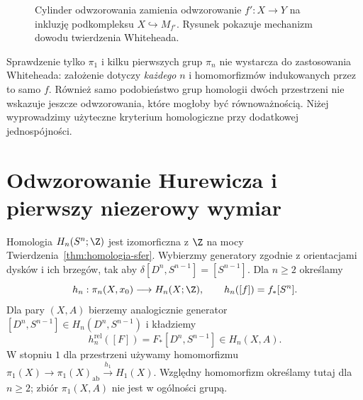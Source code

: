 \begin{figure}[H]
\centering
{}
\caption{Cylinder odwzorowania zamienia
odwzorowanie $f':X\to Y$ na inkluzję
podkompleksu $X\hookrightarrow M_{f'}$.
Rysunek pokazuje mechanizm dowodu
twierdzenia Whiteheada.}
\label{fig:cylinder-whiteheada}
\end{figure}

\begin{uwaga}
Sprawdzenie tylko $\pi_1$ i kilku pierwszych grup $\pi_n$
nie wystarcza do zastosowania Whiteheada: założenie dotyczy
\emph{każdego} $n$ i homomorfizmów indukowanych przez to samo $f$.
Również samo podobieństwo grup homologii dwóch przestrzeni
nie wskazuje jeszcze odwzorowania, które mogłoby być równoważnością.
Niżej wyprowadzimy użyteczne kryterium homologiczne
przy dodatkowej jednospójności.
\end{uwaga}

\section{Odwzorowanie Hurewicza i pierwszy niezerowy wymiar}
\label{sec:hurewicz-wyzszy}

\begin{definicja}
\label{def:mapa-hurewicza}
Homologia $H_n(S^n;\Z)$
jest izomorficzna z $\Z$
na mocy
Twierdzenia~\ref{thm:homologia-sfer}.
Wybierzmy generatory zgodnie z orientacjami dysków i ich brzegów,
tak aby $\delta[D^n,S^{n-1}]=[S^{n-1}]$.
Dla $n\geq2$ określamy
\[
 h_n:\pi_n(X,x_0)\longrightarrow H_n(X;\Z),
 \qquad h_n([f])=f_*[S^n].
\]
Dla pary $(X,A)$ bierzemy
analogicznie generator
$[D^n,S^{n-1}]
\in H_n(D^n,S^{n-1})$ i
kładziemy
\[
 h_n^{\mathrm{rel}}([F])
 =F_*[D^n,S^{n-1}]
 \in H_n(X,A).
\]
W stopniu $1$ dla przestrzeni używamy homomorfizmu
$\pi_1(X)\to\pi_1(X)_{\mathrm{ab}}\xrightarrow{h_1}H_1(X)$.
Względny homomorfizm określamy tutaj dla $n\geq2$;
zbiór $\pi_1(X,A)$ nie jest w ogólności grupą.
\end{definicja}

